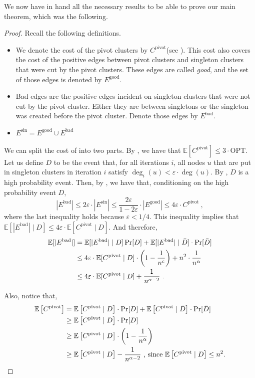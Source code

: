 \documentclass{theoretics}
\newcommand{\E}{\mathbb{E}}
\newcommand{\eps}{\ensuremath{\varepsilon}}
\newcommand{\ourcluster}{\ensuremath{C^{\textrm{pivot}}}\xspace}
\newcommand{\opt}{\textrm{OPT}\xspace}
\newcommand{\badedges}{\ensuremath{E^{\textrm{bad}}}\xspace}
\newcommand{\goodedges}{\ensuremath{E^{\textrm{good}}}\xspace}
\newcommand{\singletonedges}{\ensuremath{E^{\textrm{sin}}}\xspace}
\begin{document}
We now have in hand all the necessary results to be able to prove our main theorem, which was the following. 

\maintheorem*
\begin{proof}
Recall the following definitions.
\begin{itemize}
    \item We denote the cost of the pivot clusters by \ourcluster (see ). This cost also covers the cost of the positive edges between pivot clusters and singleton clusters that were cut by the pivot clusters. These edges are called \emph{good}, and the set of those edges is denoted by \goodedges.
    \item Bad edges are the positive edges incident on singleton clusters that were not cut by the pivot cluster. Either they are between singletons or the singleton was created before the pivot cluster. Denote those edges by \badedges.
    \item $\singletonedges = \goodedges \cup \badedges$
\end{itemize}

We can split the cost of  into two parts.
By , we have that $\E[\ourcluster] \leq 3 \cdot \opt$. 
Let us define $D$ to be the event that, for all iterations $i$, all nodes $u$ that are put in singleton clusters in iteration $i$ satisfy $\deg_i(u) < \eps\cdot \deg(u)$. 
By , $D$ is a high probability event. 
Then, by , we have that, conditioning on the high probability event $D$,
\[
    |\badedges| \leq 2\eps \cdot |\singletonedges| \leq \frac{2\eps}{1-2\eps}\cdot |\goodedges| \leq 4\eps \cdot \ourcluster \ ,
\]
where the last inequality holds because $\eps < 1/4$. 
This inequality implies that $\mathbb{E}[|\badedges|\mid D] \leq 4\eps\cdot \mathbb{E}[\ourcluster\mid D]$. And therefore,
\begin{align*}
\mathbb{E}[|\badedges|] &= \mathbb{E}[|\badedges|\mid D]\Pr[D] + \mathbb{E}[|\badedges|\mid \Bar{D}]\cdot \Pr[\Bar{D}] \\
&\leq 4\eps\cdot \mathbb{E}[\ourcluster\mid D]\cdot \left(1-\frac{1}{n^c}\right) + n^2\cdot \frac{1}{n^\alpha} \\
&\leq 4\eps\cdot \mathbb{E}[\ourcluster\mid D] + \frac{1}{n^{\alpha-2}}  \ .
\end{align*}

Also, notice that,
 \begin{align*}
     \mathbb{E}\left[\ourcluster\right] &=  \mathbb{E}\left[\ourcluster\mid D \right]\cdot \Pr[D] + \mathbb{E}\left[\ourcluster\mid \Bar{D}\right]\cdot \Pr[\Bar{D}]\\
     &\geq \mathbb{E}\left[\ourcluster  \mid D \right]\cdot \Pr[D] \\
     &\geq \mathbb{E}\left[\ourcluster\mid D \right]\cdot \left( 1-\frac{1}{n^\alpha}\right)\\
     &\geq \mathbb{E}\left[\ourcluster\mid D \right] - \frac{1}{n^{\alpha-2}} \text{ , since }\mathbb{E}\left[\ourcluster\mid D \right] \leq n^2.
 \end{align*}
 

\end{proof}
\end{document}
